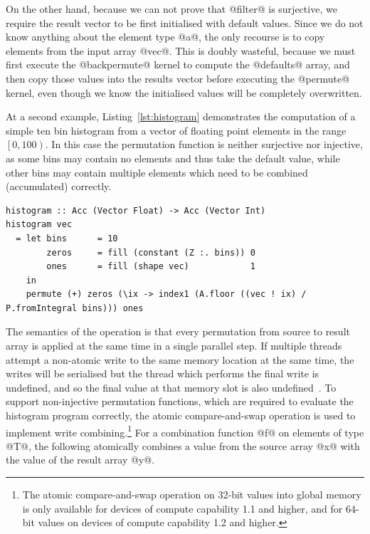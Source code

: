 On the other hand, because we can not prove that @filter@ is surjective, we
require the result vector to be first initialised with default values. Since we
do not know anything about the element type @a@, the only recourse is to
copy elements from the input array @vec@. This is doubly wasteful, because
we must first execute the @backpermute@ kernel to compute the
@defaults@ array, and then copy those values into the results vector before
executing the @permute@ kernel, even though we know the initialised values
will be completely overwritten.

At a second example, Listing~\ref{lst:histogram} demonstrates the computation of
a simple ten bin histogram from a vector of floating point elements in the range
$\left[ 0, 100 \right)$. In this case the permutation function is neither
surjective nor injective, as some bins may contain no elements and thus take the
default value, while other bins may contain multiple elements which need to be
combined (accumulated) correctly.
%
\begin{lstlisting}[style=haskell
    ,label=lst:histogram
    ,caption={[Simple histogram in Accelerate] A simple histogram written in
    Accelerate. We assume the input vector contains elements in the range
    $\left[0,100\right)$ and accumulate into ten equally sized bins.}]
histogram :: Acc (Vector Float) -> Acc (Vector Int)
histogram vec
  = let bins      = 10
        zeros     = fill (constant (Z :. bins)) 0
        ones      = fill (shape vec)            1
    in
    permute (+) zeros (\ix -> index1 (A.floor ((vec ! ix) / P.fromIntegral bins))) ones
\end{lstlisting}

The semantics of the operation is that every permutation from source to result
array is applied at the same time in a single parallel step. If multiple \CUDA
threads attempt a non-atomic write to the same memory location at the same time,
the writes will be serialised but the thread which performs the final write is
undefined, and so the final value at that memory slot is also
undefined~\cite{NVIDIA:2012wf}. To support non-injective permutation functions,
which are required to evaluate the histogram program correctly, the atomic
compare-and-swap operation is used to implement write combining.\footnote{The
atomic compare-and-swap operation on 32-bit values into global memory is only
available for devices of compute capability 1.1 and higher, and for 64-bit
values on devices of compute capability 1.2 and higher.} For a combination
function @f@ on elements of type @T@, the following atomically combines a value
from the source array @x@ with the value of the result array @y@.

